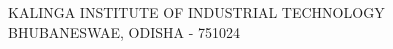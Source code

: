 \begin{titlepage}
		\begin{center}
			{\Large KALINGA INSTITUTE OF INDUSTRIAL TECHNOLOGY\\}
			\vspace{.5cm}
			BHUBANESWAE, ODISHA - 751024\\
			\vspace{.5cm}
			\cMonthAndYear
		\end{center}
	\restoregeometry
\end{titlepage}